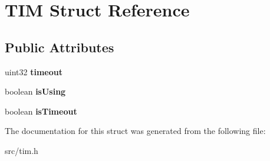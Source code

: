 \hypertarget{struct_t_i_m}{}\section{T\+I\+M Struct Reference}
\label{struct_t_i_m}
\subsection*{Public Attributes}
\begin{DoxyCompactItemize}
\item 
\hypertarget{struct_t_i_m_abd08ca6b4137503d8bc8687bd7b6c40a}{}uint32 {\bfseries timeout}\label{struct_t_i_m_abd08ca6b4137503d8bc8687bd7b6c40a}

\item 
\hypertarget{struct_t_i_m_ac5a9a516f2cc5681c9a1a6abdc2c4828}{}boolean {\bfseries is\+Using}\label{struct_t_i_m_ac5a9a516f2cc5681c9a1a6abdc2c4828}

\item 
\hypertarget{struct_t_i_m_a024282b5527064f2d48645a4482c4a1e}{}boolean {\bfseries is\+Timeout}\label{struct_t_i_m_a024282b5527064f2d48645a4482c4a1e}

\end{DoxyCompactItemize}


The documentation for this struct was generated from the following file\+:\begin{DoxyCompactItemize}
\item 
src/tim.\+h\end{DoxyCompactItemize}
